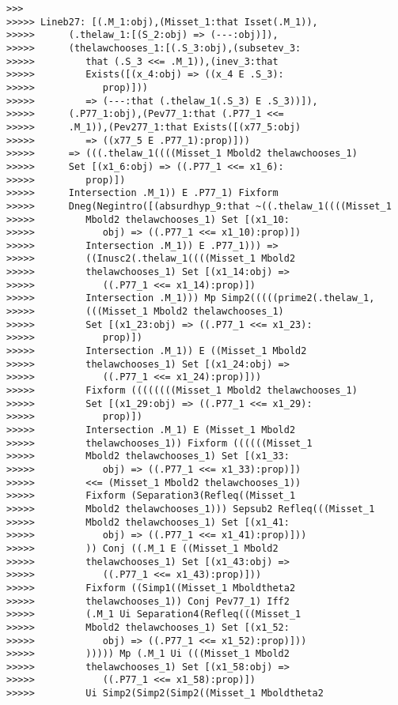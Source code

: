 \documentclass[12pt]{article}
\begin{document}
\begin{verbatim}
>>>
>>>>> Lineb27: [(.M_1:obj),(Misset_1:that Isset(.M_1)),
>>>>>      (.thelaw_1:[(S_2:obj) => (---:obj)]),
>>>>>      (thelawchooses_1:[(.S_3:obj),(subsetev_3:
>>>>>         that (.S_3 <<= .M_1)),(inev_3:that
>>>>>         Exists([(x_4:obj) => ((x_4 E .S_3):
>>>>>            prop)]))
>>>>>         => (---:that (.thelaw_1(.S_3) E .S_3))]),
>>>>>      (.P77_1:obj),(Pev77_1:that (.P77_1 <<=
>>>>>      .M_1)),(Pev277_1:that Exists([(x77_5:obj)
>>>>>         => ((x77_5 E .P77_1):prop)]))
>>>>>      => (((.thelaw_1((((Misset_1 Mbold2 thelawchooses_1)
>>>>>      Set [(x1_6:obj) => ((.P77_1 <<= x1_6):
>>>>>         prop)])
>>>>>      Intersection .M_1)) E .P77_1) Fixform
>>>>>      Dneg(Negintro([(absurdhyp_9:that ~((.thelaw_1((((Misset_1
>>>>>         Mbold2 thelawchooses_1) Set [(x1_10:
>>>>>            obj) => ((.P77_1 <<= x1_10):prop)])
>>>>>         Intersection .M_1)) E .P77_1))) =>
>>>>>         ((Inusc2(.thelaw_1((((Misset_1 Mbold2
>>>>>         thelawchooses_1) Set [(x1_14:obj) =>
>>>>>            ((.P77_1 <<= x1_14):prop)])
>>>>>         Intersection .M_1))) Mp Simp2(((((prime2(.thelaw_1,
>>>>>         (((Misset_1 Mbold2 thelawchooses_1)
>>>>>         Set [(x1_23:obj) => ((.P77_1 <<= x1_23):
>>>>>            prop)])
>>>>>         Intersection .M_1)) E ((Misset_1 Mbold2
>>>>>         thelawchooses_1) Set [(x1_24:obj) =>
>>>>>            ((.P77_1 <<= x1_24):prop)]))
>>>>>         Fixform ((((((((Misset_1 Mbold2 thelawchooses_1)
>>>>>         Set [(x1_29:obj) => ((.P77_1 <<= x1_29):
>>>>>            prop)])
>>>>>         Intersection .M_1) E (Misset_1 Mbold2
>>>>>         thelawchooses_1)) Fixform ((((((Misset_1
>>>>>         Mbold2 thelawchooses_1) Set [(x1_33:
>>>>>            obj) => ((.P77_1 <<= x1_33):prop)])
>>>>>         <<= (Misset_1 Mbold2 thelawchooses_1))
>>>>>         Fixform (Separation3(Refleq((Misset_1
>>>>>         Mbold2 thelawchooses_1))) Sepsub2 Refleq(((Misset_1
>>>>>         Mbold2 thelawchooses_1) Set [(x1_41:
>>>>>            obj) => ((.P77_1 <<= x1_41):prop)]))
>>>>>         )) Conj ((.M_1 E ((Misset_1 Mbold2
>>>>>         thelawchooses_1) Set [(x1_43:obj) =>
>>>>>            ((.P77_1 <<= x1_43):prop)]))
>>>>>         Fixform ((Simp1((Misset_1 Mboldtheta2
>>>>>         thelawchooses_1)) Conj Pev77_1) Iff2
>>>>>         (.M_1 Ui Separation4(Refleq(((Misset_1
>>>>>         Mbold2 thelawchooses_1) Set [(x1_52:
>>>>>            obj) => ((.P77_1 <<= x1_52):prop)]))
>>>>>         ))))) Mp (.M_1 Ui (((Misset_1 Mbold2
>>>>>         thelawchooses_1) Set [(x1_58:obj) =>
>>>>>            ((.P77_1 <<= x1_58):prop)])
>>>>>         Ui Simp2(Simp2(Simp2((Misset_1 Mboldtheta2

\end{verbatim}
\end{document}
